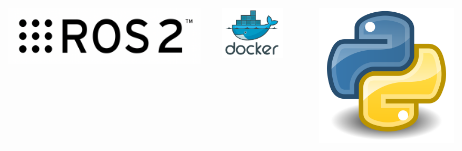 \documentclass[9pt, aspectratio=169]{beamer}
\begin{document}
\begin{frame}
\begin{columns}
\begin{column}{0.4\textwidth}
\begin{columns}
\begin{column}{0.2\textwidth}
	\begin{center}
  		\includegraphics[width=1\textwidth]{ROS2}
	\end{center}
\end{column}
\hspace{-0.6cm}
\begin{column}{0.2\textwidth}
	\begin{center}
  		\includegraphics[width=0.8\textwidth]{Docker} 
	\end{center}
\end{column}
\hspace{-0.6cm}
\begin{column}{0.2\textwidth}
	\begin{center}
  		\includegraphics[width=0.7\textwidth]{Python}

\end{center}
\end{column}
\end{columns}
\end{column}
\end{columns}
\end{frame}
\end{document}
